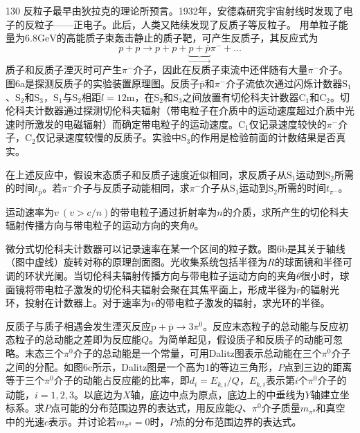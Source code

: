 \begin{problem}[第37届全国中学生物理竞赛决赛][反质子探测]{130}
    反粒子最早由狄拉克的理论所预言。1932年，安德森研究宇宙射线时发现了电子的反粒子——正电子。此后，人类又陆续发现了反质子等反粒子。
    用单粒子能量为$6.8 \mathrm{GeV}$的高能质子束轰击静止的质子靶，可产生反质子，其反应式为
    \begin{equation}
        p + p \rightarrow p + p + \underbrace {p + \overline {{p}}} _ {\longrightarrow} \pi^ {-} + \dots
        \label{eq:1.p130}
    \end{equation}
    质子和反质子湮灭时可产生$\pi ^ { - }$介子，因此在反质子束流中还伴随有大量$\pi ^ { - }$介子。图6a是探测反质子的实验装置原理图。反质子$\overline{\mathrm{p}}$和$\pi^{-}$介子流依次通过闪烁计数器$\mathrm{S}_{1}$、$\mathrm{S}_{2}$和$\mathrm{S}_{3}$，$\mathrm{S}_{1}$与$\mathrm{S}_{2}$相距$l = 12 \mathrm{m}$，在$\mathrm{S}_{2}$和$\mathrm{S}_{3}$之间放置有切伦科夫计数器$\mathrm{C}_{1}$和$\mathrm{C}_{2}$。切伦科夫计数器通过探测切伦科夫辐射（带电粒子在介质中的运动速度超过介质中光速时所激发的电磁辐射）而确定带电粒子的运动速度。$\mathrm{C}_{1}$仅记录速度较快的$\pi^{-}$介子，$\mathrm{C}_{2}$仅记录速度较慢的反质子。实验中$\mathrm{S}_{3}$的作用是检验前面的计数结果是否真实。
    \begin{subproblem}
        在上述反应中，假设末态质子和反质子速度近似相同，求反质子从$\mathrm{S}_{1}$运动到$\mathrm{S}_{2}$所需的时间$t _ { \bar { \mathrm { p } } }$。若$\pi ^ { - }$介子与反质子动能相同，求$\pi ^ { - }$介子从$\mathrm{S}_{1}$运动到$\mathrm{S}_{2}$所需的时间$t _ { \pi ^ { - } }$。
    \end{subproblem}
    \begin{subproblem}
        运动速率为$v \ ( v > c / n )$的带电粒子通过折射率为$n$的介质，求所产生的切伦科夫辐射传播方向与带电粒子的运动方向的夹角$\theta$。
    \end{subproblem}
    \begin{subproblem}
        微分式切伦科夫计数器可以记录速率在某一个区间的粒子数。图6b是其关于轴线（图中虚线）旋转对称的原理剖面图。光收集系统包括半径为$R$的球面镜和半径可调的环状光阑。当切伦科夫辐射传播方向与带电粒子运动方向的夹角$\theta$很小时，球面镜将带电粒子激发的切伦科夫辐射会聚在其焦平面上，形成半径为$r$的辐射光环，投射在计数器上。对于速率为$v$的带电粒子激发的辐射，求光环的半径。
    \end{subproblem}
    \begin{subproblem}
        反质子与质子相遇会发生湮灭反应$\mathrm{p} + \overline{\mathrm{p}} \to 3 \pi ^ { 0 }$。反应末态粒子的总动能与反应初态粒子的总动能之差即为反应能$Q$。为简单起见，假设质子和反质子的动能可忽略。末态三个$\pi ^ { 0 }$介子的总动能是一个常量，可用Dalitz图表示总动能在三个$\pi ^ { 0 }$介子之间的分配。如图6c所示，Dalitz图是一个高为1的等边三角形，$P$点到三边的距离等于三个$\pi ^ { 0 }$介子的动能占反应能的比率，即$d _ { i } = E _ { k , i } / Q$，$E _ { k , i }$表示第$i$个$\pi ^ { 0 }$介子的动能，$i =1,2,3$。以底边为$X$轴，底边中点为原点，底边上的中垂线为$Y$轴建立坐标系。求$P$点可能的分布范围边界的表达式，用反应能$Q$、$\pi ^ { 0 }$介子质量$m _ { \pi ^ { 0 } }$和真空中的光速$c$表示。并讨论若$m _ { \pi ^ { 0 } } = 0$时，$P$点的分布范围边界的表达式。

\end{subproblem}
\end{problem}
